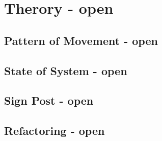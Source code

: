 \part{Therory - open}
\chapter{Pattern of Movement - open}
\chapter{State of System - open}
\chapter{Sign Post - open}
\chapter{Refactoring - open}